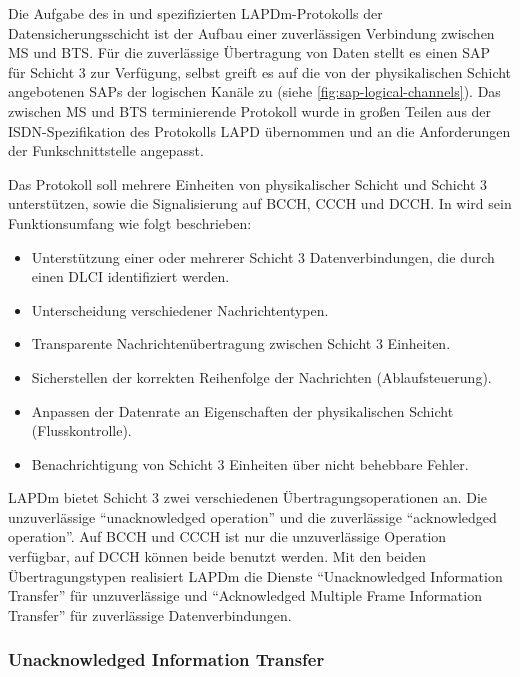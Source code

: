 Die Aufgabe des in  und  spezifizierten \ac{LAPDm}-Protokolls der Datensicherungsschicht ist der Aufbau einer zuverlässigen Verbindung zwischen \ac{MS} und \ac{BTS}. Für die zuverlässige Übertragung von Daten stellt es einen \ac{SAP} für Schicht 3 zur Verfügung, selbst greift es auf die von der physikalischen Schicht angebotenen \acp{SAP} der logischen Kanäle zu (siehe \autoref{fig:sap-logical-channels}). Das zwischen \ac{MS} und \ac{BTS} terminierende Protokoll wurde in großen Teilen aus der \ac{ISDN}-Spezifikation des Protokolls \ac{LAPD} übernommen und an die Anforderungen der Funkschnittstelle angepasst. 

Das Protokoll soll mehrere Einheiten von physikalischer Schicht und Schicht 3 unterstützen, sowie die Signalisierung auf \ac{BCCH}, \ac{CCCH} und \ac{DCCH}. In  wird sein Funktionsumfang wie folgt beschrieben:

\begin{itemize}
\item Unterstützung einer oder mehrerer Schicht 3 Datenverbindungen, die durch einen \ac{DLCI} identifiziert werden.
\item Unterscheidung verschiedener Nachrichtentypen.
\item Transparente Nachrichtenübertragung zwischen Schicht 3 Einheiten.
\item Sicherstellen der korrekten Reihenfolge der Nachrichten (Ablaufsteuerung).
\item Anpassen der Datenrate an Eigenschaften der physikalischen Schicht (Flusskontrolle).
\item Benachrichtigung von Schicht 3 Einheiten über nicht behebbare Fehler. 
\end{itemize}

\ac{LAPDm} bietet Schicht 3 zwei verschiedenen Übertragungsoperationen an. Die unzuverlässige "`unacknowledged operation"' und die zuverlässige "`acknowledged operation"'. Auf \ac{BCCH} und \ac{CCCH} ist nur die unzuverlässige Operation verfügbar, auf \ac{DCCH} können beide benutzt werden. Mit den beiden Übertragungstypen realisiert \ac{LAPDm} die Dienste "`Unacknowledged Information Transfer"' für unzuverlässige und "`Acknowledged Multiple Frame Information Transfer"' für zuverlässige Datenverbindungen.

\subsubsection*{Unacknowledged Information Transfer}

